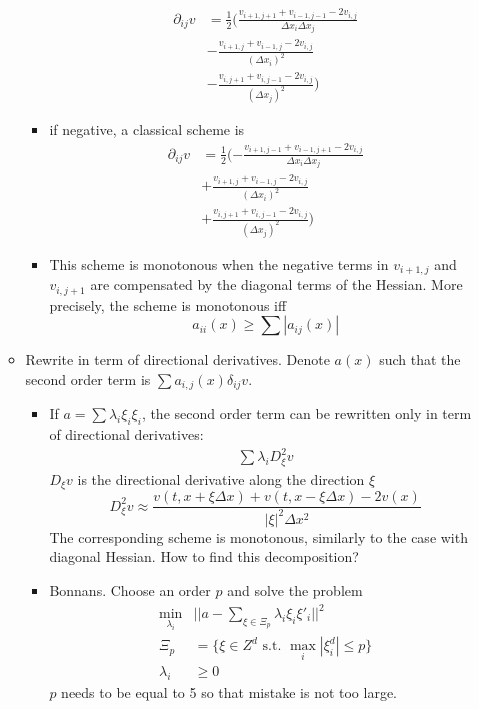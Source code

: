 \documentclass[english]{article}
\begin{document}
\begin{itemize}
\begin{itemize}
\begin{itemize}
			\begin{align*}
				\partial_{ij}v&= \frac{1}{2}(\frac{v_{i+1, j+1} + v_{i-1, j-1}- 2v_{i,j}}{\Delta x_i \Delta x_j} \\
				&-  \frac{v_{i+1, j} + v_{i-1, j}- 2v_{i,j}}{(\Delta x_i)^2}\\
				&-  \frac{v_{i, j+1} + v_{i, j-1}- 2v_{i,j}}{(\Delta x_j)^2})
			\end{align*}
			\item if negative, a classical scheme is
			\begin{align*}
				\partial_{ij}v&= \frac{1}{2}(-\frac{v_{i+1, j-1} + v_{i-1, j+1}- 2v_{i,j}}{\Delta x_i \Delta x_j} \\
				&+  \frac{v_{i+1, j} + v_{i-1, j}- 2v_{i,j}}{(\Delta x_i)^2}\\
				&+  \frac{v_{i, j+1} + v_{i, j-1}- 2v_{i,j}}{(\Delta x_j)^2})
			\end{align*}
			\item This scheme is monotonous when the negative terms in $v_{i+1, j}$ and $v_{i, j+1}$ are compensated by the diagonal terms of the Hessian. More precisely, the scheme is monotonous iff 		$$a_{ii}(x) \geq \sum |a_{ij}(x)|$$
		\end{itemize}
		\item Rewrite in term of directional derivatives. Denote $a(x)$ such that the second order term is $\sum a_{i, j}(x) \delta_{ij} v$.
		\begin{itemize}
			\item If  $a = \sum \lambda_i \xi_i \xi_i$, the second order term can be rewritten only in term of directional derivatives:
			\begin{align*}
				\sum \lambda_i D_\xi^2v
			\end{align*}
			$D_\xi v$ is the directional derivative along the direction $\xi$
			$$D^2_\xi v \approx \frac{v(t, x+\xi \Delta x) + v(t, x-\xi \Delta x) - 2 v(x)}{|\xi|^2 \Delta x^2}$$
			The corresponding scheme is monotonous, similarly to the case with diagonal Hessian. 
			How to find this decomposition?
			\item 
			Bonnans. Choose an order $p$ and solve the problem 
			\begin{align*}
				\min_{\lambda_i}&||a - \sum_{\xi \in \Xi_p} \lambda_i \xi_i \xi'_i||^2\\
				\Xi_p &= \{\xi \in Z^d \text{ s.t. }  \max_i|\xi_i^d| \leq p \}\\
				\lambda_i &\geq 0
			\end{align*}
			$p$ needs to be equal to 5 so that mistake is not too large.

\end{itemize}
\end{itemize}
\end{itemize}
\end{document}
